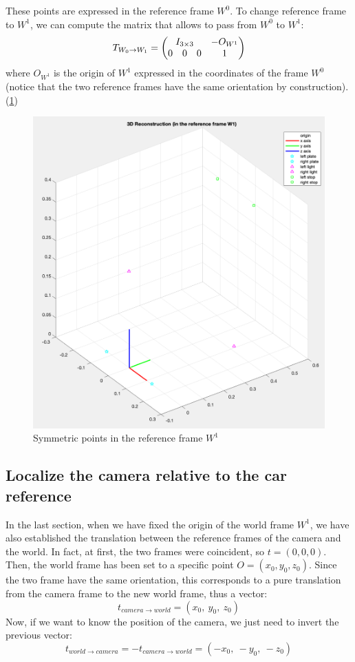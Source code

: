\documentclass{article}
\begin{document}
These points are expressed in the reference frame $W^0$. To change reference frame to $W^1$, we can compute the matrix that allows to pass from $W^0$ to $W^1$:
$$ T_{W_0 \rightarrow W_1} = \begin{pmatrix} \multicolumn{3}{c}{I_{3 \times 3}} & -O_{W^1} \\
0 & 0 & 0 & 1
\end{pmatrix} $$
where $O_{W^1}$ is the origin of $W^1$ expressed in the coordinates of the frame $W^0$ (notice that the two reference frames have the same orientation by construction). (\ref{fig:3dreconstructionW1})
\begin{figure}[hbt!]
\centering
\includegraphics[scale=0.3]{images/3DreconstructionW1.png}
\caption{Symmetric points in the reference frame $W^1$}
\label{fig:3dreconstructionW1}
\end{figure}

\newpage
\subsection{Localize the camera relative to the car reference}
In the last section, when we have fixed the origin of the world frame $W^1$, we have also established the translation between the reference frames of the camera and the world. In fact, at first, the two frames were coincident, so $t=(0, 0, 0)$. Then, the world frame has been set to a specific point $O=(x_0, y_0, z_0)$. Since the two frame have the same orientation, this corresponds to a pure translation from the camera frame to the new world frame, thus a vector:
$$ t_{camera \rightarrow world} = (x_0, \: y_0, \: z_0) $$
Now, if we want to know the position of the camera, we just need to invert the previous vector:
$$ t_{world \rightarrow camera} = -t_{camera \rightarrow world} = (-x_0, \: -y_0, \: -z_0) $$
\end{document}
